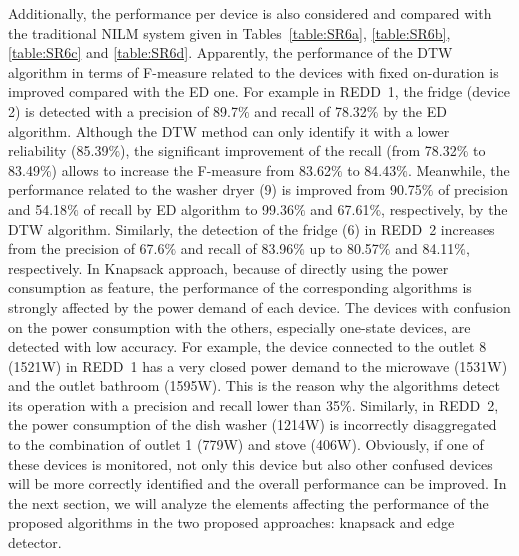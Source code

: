 Additionally, the performance per device is also considered and compared with the traditional NILM system given in Tables~\ref{table:SR6a}, \ref{table:SR6b}, \ref{table:SR6c} and \ref{table:SR6d}. 
Apparently, the performance of the DTW algorithm in terms of F-measure related to the devices with fixed on-duration is improved compared with the ED one. For example in REDD~1, the fridge (device 2) is detected with a precision of 89.7$\%$ and recall of 78.32$\%$ by the ED algorithm. Although the DTW method can only identify it with a lower reliability (85.39$\%$), the significant improvement of the recall (from 78.32$\%$ to 83.49$\%$) allows to increase the F-measure from 83.62$\%$ to 84.43$\%$. Meanwhile, the performance related to the washer dryer (9) is improved from 90.75$\%$ of precision and 54.18$\%$ of recall by ED algorithm to 99.36$\%$ and 67.61$\%$, respectively, by the DTW algorithm.
Similarly, the detection of the fridge (6) in REDD~2 increases from the precision of 67.6$\%$ and recall of 83.96$\%$ up to 80.57$\%$ and 84.11$\%$, respectively.
In Knapsack approach, because of directly using the power consumption as feature, the performance of the corresponding algorithms is strongly affected by the power demand of each device. The devices with confusion on the power consumption with the others, especially one-state devices, are detected with low accuracy. For example, the device connected to the outlet 8 (1521W) in REDD~1 has a very closed power demand to the microwave (1531W) and the outlet bathroom (1595W). This is the reason why the algorithms detect its operation with a precision and recall lower than 35$\%$. Similarly, in REDD~2, the power consumption of the dish washer (1214W) is incorrectly disaggregated to the combination of outlet 1 (779W) and stove (406W). Obviously, if one of these devices is monitored, not only this device but also other confused devices will be more correctly identified and the overall performance can be improved.
In the next section, we will analyze the elements affecting the performance of the proposed algorithms in the two proposed approaches: knapsack and edge detector.








